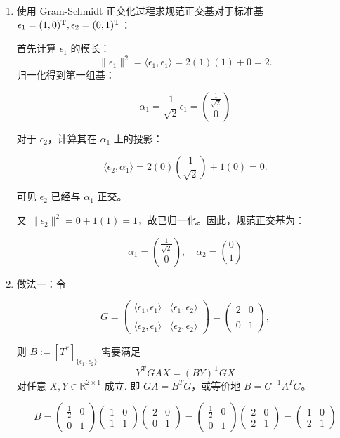 \begin{enumerate}

\item
  使用 Gram-Schmidt 正交化过程求规范正交基对于标准基
  \(\epsilon_{1} = (1,0)^{\rm T}, \epsilon_{2} = (0,1)^{\rm T}\)：
  
  首先计算 \(\epsilon_{1}\) 的模长：
  \[\|\epsilon_{1}\|^{2} = \langle\epsilon_{1},\epsilon_{1}\rangle = 2(1)(1)+0=2.\]
  归一化得到第一组基：

\[\alpha_{1} = \frac{1}{\sqrt{2}} \epsilon_{1} = \binom{\frac {1}{\sqrt {2}}}{0}\]

对于 \(\epsilon_{2}\)，计算其在 \(\alpha_{1}\) 上的投影：

\[\langle \epsilon_{2}, \alpha_{1} \rangle = 2(0)\left(\frac{1}{\sqrt{2}}\right) + 1(0) = 0.\]

可见 \(\epsilon_{2}\) 已经与 \(\alpha_{1}\) 正交。

又 \(\|\epsilon_{2}\|^{2} = 0 + 1(1) = 1\)，故已归一化。因此，规范正交基为：

\[\alpha_{1} = \binom{\frac{1}{\sqrt{2}}}{0}, \quad \alpha_{2} = \binom{0}{1}\]

\item
  做法一：令

\[G = \begin{pmatrix} \langle \epsilon_{1}, \epsilon_{1} \rangle & \langle \epsilon_ {1}, \epsilon_ {2} \rangle \\ \\
\langle \epsilon_{2}, \epsilon_{1} \rangle & \langle \epsilon_{2}, \epsilon_{2} \rangle \end{pmatrix} 
= \begin{pmatrix} 2 & 0 \\ \\ 0 & 1 \end{pmatrix},\]

则 \(B := [T^{*}]_{\{\epsilon_1, \epsilon_2\}}\) 需要满足
\[Y^{\mathrm{T}}GAX = (BY)^{\mathrm{T}}GX\]
对任意 \(X, Y \in \mathbb{R}^{2 \times 1}\) 成立. 
即 \(GA = B^{T}G\)，或等价地 \(B = G^{-1}A^{T}G\)。

\[B = \begin{pmatrix} \frac{1}{2} & 0 \\ 0 & 1 \end{pmatrix} 
\begin{pmatrix} 1 & 0 \\ 1 & 1 \end{pmatrix} 
\begin{pmatrix} 2 & 0 \\ 0 & 1 \end{pmatrix}  
=  \begin{pmatrix} \frac{1}{2} & 0 \\ 0 & 1 \end{pmatrix} 
\begin{pmatrix} 2 & 0 \\ 2 & 1 \end{pmatrix} 
= \begin{pmatrix} 1 & 0 \\ 2 & 1 \end{pmatrix}\]


\end{enumerate}
